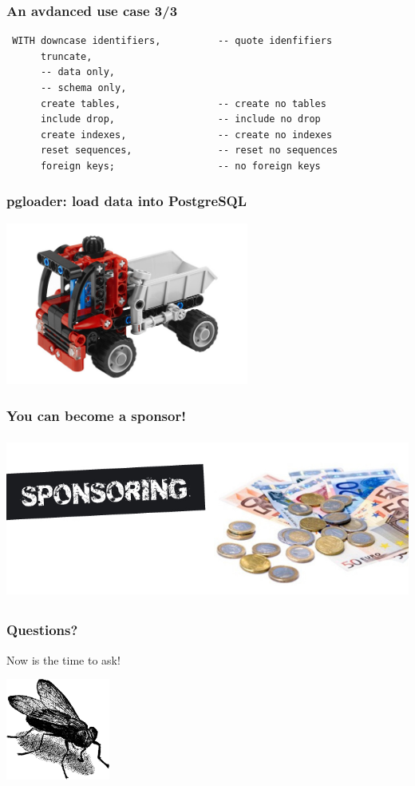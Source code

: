 \documentclass{beamer}
\begin{document}
\begin{frame}[fragile]
  \frametitle{An avdanced use case 3/3}

\begin{verbatim}
 WITH downcase identifiers,          -- quote idenfifiers
      truncate,
      -- data only,
      -- schema only,
      create tables,                 -- create no tables
      include drop,                  -- include no drop
      create indexes,                -- create no indexes
      reset sequences,               -- reset no sequences
      foreign keys;                  -- no foreign keys
\end{verbatim}
\end{frame}

\begin{frame}
  \frametitle{pgloader: load data into PostgreSQL}


  \begin{center}
    \includegraphics[height=2.1in]{pgloader.jpg}
  \end{center}
\end{frame}

\begin{frame}
  \frametitle{You can become a sponsor!}


  \begin{center}
    \includegraphics[height=2.1in]{sponsoring.jpg}
  \end{center}
\end{frame}

\begin{frame}
  \frametitle{Questions?}

  \begin{center}
    Now is the time to ask!
    \vfill

    \includegraphics[height=9em]{fly.png}
  \end{center}
\end{frame}
\end{document}
